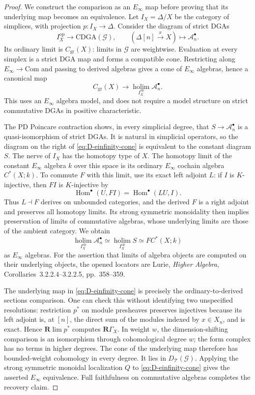 \begin{proof}
We construct the comparison as an $E_\infty$ map before proving that
its underlying map becomes an equivalence. Let $I_X=\Delta/X$ be
the category of simplices, with projection $p:I_X\to\Delta$.
Consider the diagram of strict DGAs
\[
 I_X^{\mathrm{op}}\longrightarrow\mathrm{CDGA}(\mathcal G),
 \qquad (\Delta[n]\xrightarrow{x}X)\longmapsto\mathcal A_n^\bullet.
\]
Its ordinary limit is $C_{\mathrm{gr}}(X)$: limits in $\mathcal G$
are weightwise. Evaluation at every simplex is a strict DGA map and
forms a compatible cone. Restricting along $E_\infty\to\mathrm{Com}$
and passing to derived algebras gives a cone of $E_\infty$ algebras,
hence a canonical map
\begin{equation}\label{eq:D-einfinity-cone}
 C_{\mathrm{gr}}(X)
 \longrightarrow\operatorname*{holim}_{I_X^{\mathrm{op}}}
       \mathcal A_n^\bullet.
\end{equation}
This uses an $E_\infty$ algebra model, and does not require a model
structure on strict commutative DGAs in positive characteristic.

The PD Poincare contraction shows, in every simplicial degree, that
$S\to\mathcal A_n^\bullet$ is a quasi-isomorphism of strict DGAs.
It is natural in simplicial operators, so the diagram on the right
of \eqref{eq:D-einfinity-cone} is equivalent to the constant diagram
$S$. The nerve of $I_X$ has the homotopy type of $X$. The homotopy
limit of the constant $E_\infty$ algebra $k$ over this space is its
ordinary $E_\infty$ cochain algebra $C^*(X;k)$. To commute $F$ with
this limit, use its exact left adjoint $L$: if $I$ is $K$-injective,
then $FI$ is $K$-injective by
\[
 \operatorname{Hom}^{\bullet}(U,FI)
 =\operatorname{Hom}^{\bullet}(LU,I).
\]
Thus $L\dashv F$ derives on unbounded categories, and the derived
$F$ is a right adjoint and preserves all homotopy limits. Its strong
symmetric monoidality then implies preservation of limits of
commutative algebras, whose underlying limits are those of the
ambient category. We obtain
\[
 \operatorname*{holim}_{I_X^{\mathrm{op}}}\mathcal A_n^\bullet
 \simeq \operatorname*{holim}_{I_X^{\mathrm{op}}}S
 \simeq F C^*(X;k)
\]
as $E_\infty$ algebras.
For the assertion that limits of algebra objects are computed on
their underlying objects, the opened locators are Lurie,
\emph{Higher Algebra}, Corollaries~3.2.2.4--3.2.2.5, pp.~358--359.

The underlying map in \eqref{eq:D-einfinity-cone} is precisely the
ordinary-to-derived sections comparison. One can check this without
identifying two unspecified resolutions: restriction $p^*$ on module
presheaves preserves injectives because its left adjoint is, at
$[n]$, the direct sum of the modules indexed by $x\in X_n$, and is
exact. Hence $\mathbf R\lim p^*$ computes $\mathbf R\Gamma_X$.
In weight $w$, the dimension-shifting comparison is an isomorphism
through cohomological degree $w$; the form complex has no terms in
higher degrees. The cone of the underlying map therefore has
bounded-weight cohomology in every degree. It lies in
$D_{\mathcal T}(\mathcal G)$. Applying the strong symmetric monoidal
localization $Q$ to \eqref{eq:D-einfinity-cone} gives the asserted
$E_\infty$ equivalence. Full faithfulness on commutative algebras
completes the recovery claim.
\end{proof}

